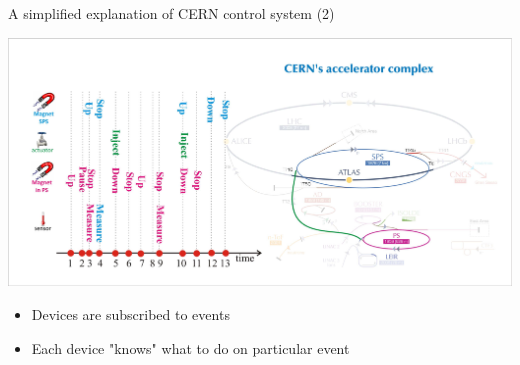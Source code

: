 \documentclass[compress,red]{beamer}
\begin{document}
\begin{frame}{A simplified explanation of CERN control system (2)}

      \begin{center}
      \includegraphics[width=1.0\textwidth]{applications/CERN/event2.pdf}
      \end{center}

  \begin{itemize}
    \item Devices are subscribed to events 
    \item Each device "knows" what to do on particular event
  \end{itemize}


\end{frame}
\end{document}
